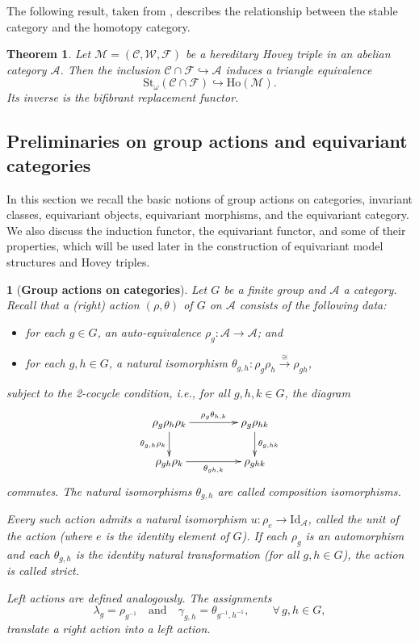 \documentclass[12pt,twoside]{amsart}
\theoremstyle{bfupright head,slanted body}
\theoremstyle{bfupright head,upright body}
\newtheorem{bfhpg}[res]{}               \newtheorem*{bfhpg*}{}
\theoremstyle{fixed bf head,slanted body}
\newtheorem{thm}[res]{Theorem}          \newtheorem*{thm*}{Theorem}
\theoremstyle{fixed bf head,upright body}
\theoremstyle{numbered paragraph}
\newcommand{\thmcite}[2][?]{\cite[Theorem~#1]{#2}}
\numberwithin{equation}{res}
\newcommand{\calC}{\mathcal{C}}
\newcommand{\calW}{\mathcal{W}}
\newcommand{\calF}{\mathcal{F}}
\newcommand{\calA}{\mathcal{A}}
\newcommand{\calM}{\mathcal{M}}
\newcommand{\Ho}{\mathrm{Ho}}
\newcommand{\St}{\mathrm{St}}
\newcommand{\Id}{\mathrm{Id}}
\begin{document}
The following result, taken from \thmcite[4.3]{2016Gill}, describes the relationship between the stable category and the homotopy category.

\begin{thm} \label{hered Hovey correspondence}
Let $\calM = (\calC, \calW, \calF)$ be a hereditary Hovey triple in an abelian category $\calA$.
Then the inclusion $\calC \cap \calF \hookrightarrow \calA$ induces a triangle equivalence
\[
\St_\omega(\calC \cap \calF) \hookrightarrow \Ho(\calM).
\]
Its inverse is the bifibrant replacement functor.
\end{thm}


\subsection{Preliminaries on group actions and equivariant categories}
\label{sec:equivariant}
In this section we recall the basic notions of group actions on categories, invariant classes, equivariant objects, equivariant morphisms, and the equivariant category. We also discuss the induction functor, the equivariant functor, and some of their properties, which will be used later in the construction of equivariant model structures and Hovey triples.

\begin{bfhpg}[\bf Group actions on categories]\label{GrAct on Cat}
Let \(G\) be a finite group and \(\calA\) a category.
Recall that a (right) \emph{action} \((\rho,\theta)\) of \(G\) on \(\calA\) consists of the following data:
\begin{itemize}
\item for each \(g\in G\), an auto-equivalence \(\rho_g:\calA\to\calA\); and
\item for each \(g,h\in G\), a natural isomorphism \(\theta_{g,h}:\rho_g\rho_h \overset{\cong}{\longrightarrow} \rho_{gh}\),
\end{itemize}
subject to the \emph{2-cocycle condition}, i.e., for all \(g,h,k\in G\), the diagram
\[
\xymatrix@R=0.75cm@C=1.5cm{
  \rho_g \rho_h \rho_k
\ar[d]_-{\theta_{g, h} \rho_k}
\ar[r]^-{\rho_g \theta_{h, k}}
& \rho_g \rho_{hk}
\ar[d]^-{\theta_{g, hk}}  \\
  \rho_{gh} \rho_k
\ar[r]_-{\theta_{gh,k}}
& \rho_{ghk}}
\]
commutes. The natural isomorphisms \(\theta_{g,h}\) are called \emph{composition isomorphisms}.

Every such action admits a natural isomorphism \(u:\rho_e \to \Id_{\calA}\), called the \emph{unit} of the action (where \(e\) is the identity element of \(G\)).
If each \(\rho_g\) is an automorphism and each \(\theta_{g,h}\) is the identity natural transformation (for all \(g,h\in G\)), the action is called \emph{strict}.

Left actions are defined analogously. The assignments
\[
\lambda_g=\rho_{g^{-1}} \quad\text{and}\quad \gamma_{g,h}=\theta_{g^{-1},h^{-1}}, \qquad \forall\,g,h\in G,
\]
translate a right action into a left action.
\end{bfhpg}
\end{document}
